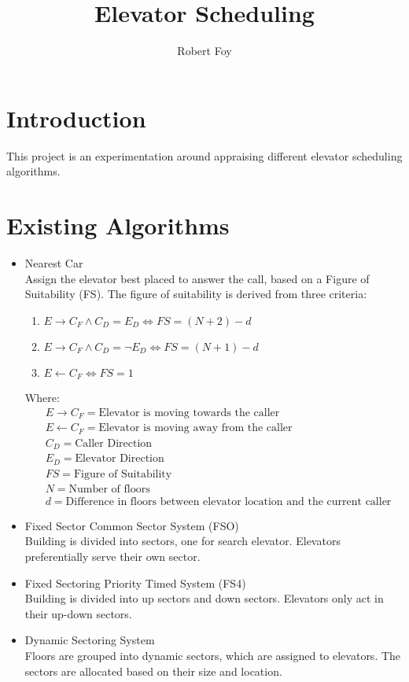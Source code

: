 \documentclass{article}
\title{Elevator Scheduling}
\author{Robert Foy}
\date{ }
\begin{document}
\maketitle

\tableofcontents

\section{Introduction}
This project is an experimentation around appraising different elevator scheduling algorithms.

\section{Existing Algorithms}
\begin{itemize}
   \item Nearest Car \hfill \\
   Assign the elevator best placed to answer the call, based on a Figure of Suitability (FS).
   The figure of suitability is derived from three criteria:
   \begin{enumerate}
      \item $E \rightarrow C_{F} \land C_{D} = E{_D} \iff FS = (N + 2) - d$
      \item $E \rightarrow C_{F} \land C_{D} = \neg E_{D} \iff FS = (N + 1) -d$
      \item $E \leftarrow C_{F} \iff FS = 1$
   \end{enumerate}
   Where:
   \begin{align*}
      &E \rightarrow C_{F} = \text{Elevator is moving towards the caller} \\
      &E \leftarrow C_{F} = \text{Elevator is moving away from the caller} \\
      &C_{D} = \text{Caller Direction} \\
      &E_{D} = \text{Elevator Direction} \\
      &FS = \text{Figure of Suitability} \\
      &N = \text{Number of floors} \\
      &d = \text{Difference in floors between elevator location and the current caller}
   \end{align*}
   \item Fixed Sector Common Sector System (FSO) \hfill \\
   Building is divided into sectors, one for search elevator. Elevators preferentially serve their own sector.
   \item Fixed Sectoring Priority Timed System (FS4) \hfill \\
   Building is divided into up sectors and down sectors. Elevators only act in their up-down sectors.
   \item Dynamic Sectoring System  \hfill \\
   Floors are grouped into dynamic sectors, which are assigned to elevators. The sectors are allocated based on their size and location.
\end{itemize}
\end{document}
